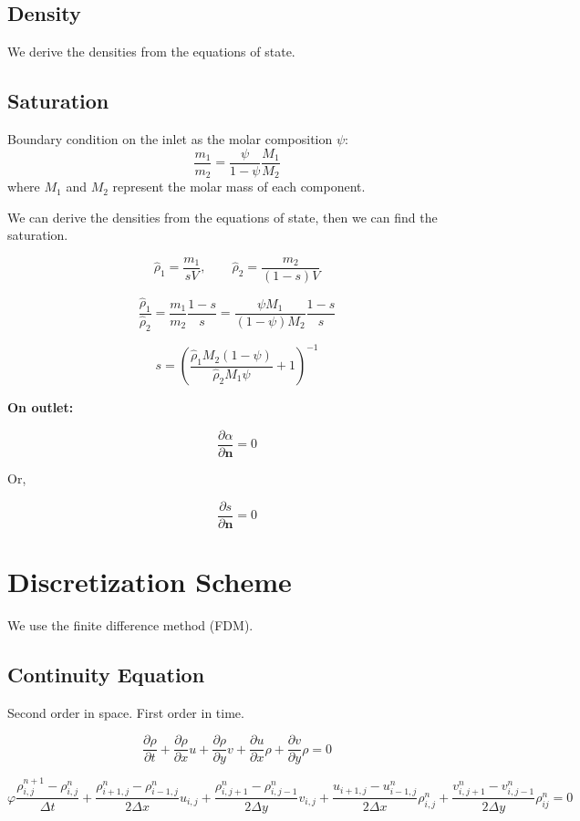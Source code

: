 \documentclass[a4paper,12pt]{article}
\begin{document}
\subsection{Density}

We derive the densities from the equations of state.

\subsection{Saturation}
    Boundary condition on the inlet as the molar
    composition \(\psi\):
    \[
        \frac{m_1}{m_2} = \frac{\psi}{1 - \psi}
        \frac{M_1}{M_2}
    \] 
    where \(M_1\) and \(M_2\) represent the molar mass 
    of each component.

    We can derive the densities from the equations of state,
    then we can find the saturation.

    \[
    \hat \rho_1 = \frac{m_1}{sV}, \qquad
    \hat \rho_2 = \frac{m_2}{(1 - s)V}
    \] 

    \[
    \frac{\hat \rho_1}{\hat \rho_2} = \frac{m_1}{m_2}
    \frac{1 - s}{s}
    = \frac{\psi M_1}{(1 - \psi) M_2}\frac{1 - s}{s}
    \] 

    \[
        s = \left( 
        \frac{\hat \rho_1 M_2(1 - \psi) }{\hat \rho_2 M_1 \psi}
    + 1 \right)^{-1}
    \] 

    \textbf{On outlet:}

    \[
    \frac{\partial \alpha}{\partial \bm{n}} = 0
    \] 

    Or,

    \[
    \frac{\partial s}{\partial \bm{n}} = 0 
    \] 

\section{Discretization Scheme}

We use the finite difference method (FDM).

\subsection{Continuity Equation}

Second order in space. First order in time.

\[
\frac{\partial \rho}{\partial t}
+ \frac{\partial \rho}{\partial x} u
+ \frac{\partial \rho}{\partial y} v
+ \frac{\partial u}{\partial x} \rho
+ \frac{\partial v}{\partial y} \rho = 0
\] 

\[
\varphi \frac{\rho^{n + 1}_{i, j} - \rho^n_{i, j}}{\Delta t}
+ \frac{\rho_{i+1, j}^n - \rho_{i-1,j}^n}{2\Delta x} u_{i,j}
+ \frac{\rho_{i, j+1}^n - \rho_{i,j-1}^n}{2\Delta y} v_{i,j}
+ \frac{u_{i+1, j} - u_{i-1,j}^n}{2\Delta x} \rho_{i,j}^n
+ \frac{v_{i, j+1}^n - v_{i,j-1}^n}{2\Delta y} \rho_{ij}^n = 0
\] 
\end{document}

